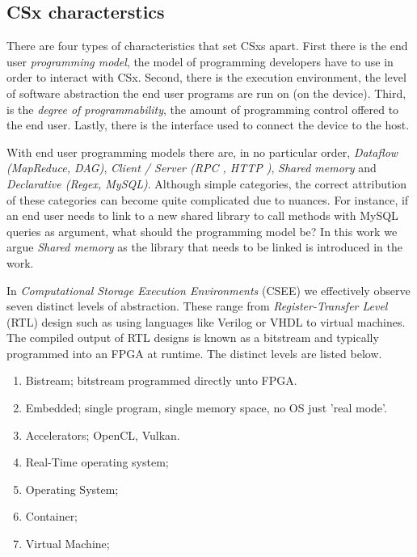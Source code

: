 
\subsection{CSx characterstics}

There are four types of characteristics that set CSxs apart. First there is
the end user \textit{programming model}, the model of programming developers
have to use in order to interact with CSx. Second, there is the execution
environment, the level of software abstraction the end user programs are run on
(on the device). Third, is the \textit{degree of programmability}, the amount of
programming control offered to the end user. Lastly, there is the interface used
to connect the device to the host.

With end user programming models there are, in no particular order,
\textit{Dataflow (MapReduce, DAG)}, \textit{Client / Server
(RPC \footnotemark[1], HTTP \footnotemark[2])}, \textit{Shared memory} and
\textit{Declarative (Regex, MySQL)}. Although simple categories, the correct
attribution of these categories can become quite complicated due to nuances. For
instance, if an end user needs to link to a new shared library to call methods
with MySQL queries as argument, what should the programming model be? In this
work we argue \textit{Shared memory} as the library that needs to be linked is
introduced in the work.



In \textit{Computational Storage Execution Environments} (CSEE) we effectively
observe seven distinct levels of abstraction. These range from
\textit{Register-Transfer Level} (RTL) design such as using languages like
Verilog or VHDL to virtual machines. The compiled output of RTL designs is known
as a bitstream and typically programmed into an FPGA at runtime. The distinct
levels are listed below.

\begin{enumerate}
    \item Bistream; bitstream programmed directly unto FPGA.
    \item Embedded; single program, single memory space, no OS just 'real mode'.
    \item Accelerators; OpenCL, Vulkan.
    \item Real-Time operating system;
    \item Operating System;
    \item Container;
    \item Virtual Machine;
\end{enumerate}

